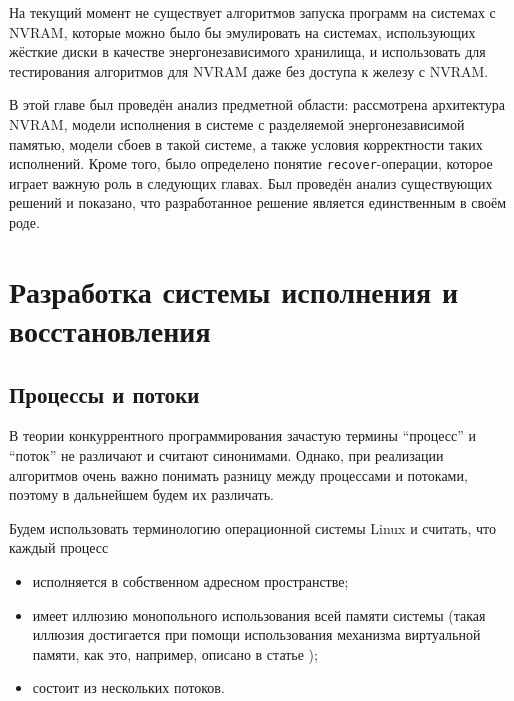 \documentclass[times,specification,annotation]{itmo-student-thesis}
\begin{document}
На текущий момент не существует алгоритмов запуска программ на системах с NVRAM, которые можно было бы эмулировать на системах, использующих жёсткие диски в качестве энергонезависимого хранилища, и использовать для тестирования алгоритмов для NVRAM даже без доступа к железу с NVRAM.

\chapterconclusion

В этой главе был проведён анализ предметной области: рассмотрена архитектура NVRAM, модели исполнения в системе с разделяемой энергонезависимой памятью, модели сбоев в такой системе, а также условия корректности таких исполнений. Кроме того, было определено понятие \texttt{recover}-операции, которое играет важную роль в следующих главах. Был проведён анализ существующих решений и показано, что разработанное решение является единственным в своём роде.

\finishrelatedwork

\chapter{Разработка системы исполнения и восстановления}
\label{system-impl}

\section{Процессы и потоки}

В теории конкуррентного программирования зачастую термины ``процесс'' и ``поток'' не различают и считают синонимами. Однако, при реализации алгоритмов очень важно понимать разницу между процессами и потоками, поэтому в дальнейшем будем их различать.

Будем использовать терминологию операционной системы Linux и считать, что каждый процесс \cite{process}

\begin{itemize}
    \item исполняется в собственном адресном пространстве;
    
    \item имеет иллюзию монопольного использования всей памяти системы (такая иллюзия достигается при помощи использования механизма виртуальной памяти, как это, например, описано в статье \cite{denning1970virtual});
    
    \item состоит из нескольких потоков.
\end{itemize}

\bigbreak
\end{document}
